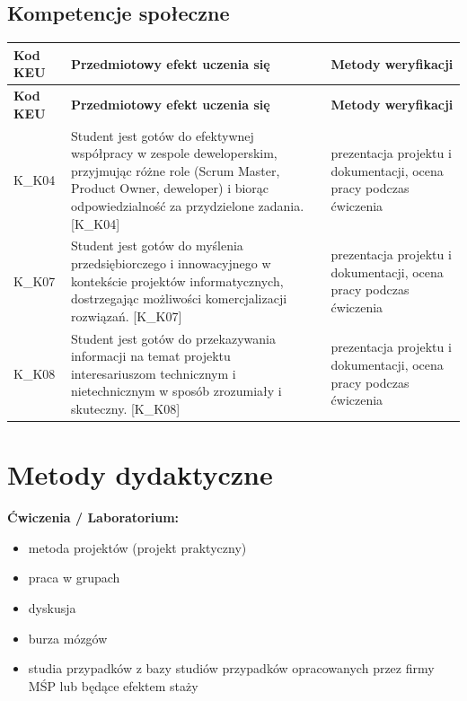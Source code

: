 \documentclass[12pt, a4paper]{article}
\newcommand{\thdrule}{\noalign{\global\setlength{\extrarowheight}{0pt}}}
\newcommand{\thdend}{\noalign{\global\setlength{\extrarowheight}{3pt}}}
\begin{document}
\subsection*{Kompetencje społeczne}
{\scriptsize
\begin{longtable}{m{1.6cm}m{9.0cm}m{4.2cm}}
\thdrule\toprule
\rowcolor{pjatkRed} {\color{white}\footnotesize\textbf{\vphantom{Ag}Kod KEU}} & {\color{white}\footnotesize\textbf{\vphantom{Ag}Przedmiotowy efekt uczenia się}} & {\color{white}\footnotesize\textbf{\vphantom{Ag}Metody weryfikacji}} \\
\midrule\thdend
\endfirsthead
\thdrule\toprule
\rowcolor{pjatkRed} {\color{white}\footnotesize\textbf{\vphantom{Ag}Kod KEU}} & {\color{white}\footnotesize\textbf{\vphantom{Ag}Przedmiotowy efekt uczenia się}} & {\color{white}\footnotesize\textbf{\vphantom{Ag}Metody weryfikacji}} \\
\midrule\thdend
\endhead
  \rowcolor{tableRowLight} K\_K04 & Student jest gotów do efektywnej współpracy w zespole deweloperskim, przyjmując różne role (Scrum Master, Product Owner, deweloper) i biorąc odpowiedzialność za przydzielone zadania. {[}K\_K04{]} & prezentacja projektu i dokumentacji, ocena pracy podczas ćwiczenia \\
  \rowcolor{tableRowAlt} K\_K07 & Student jest gotów do myślenia przedsiębiorczego i innowacyjnego w kontekście projektów informatycznych, dostrzegając możliwości komercjalizacji rozwiązań. {[}K\_K07{]} & prezentacja projektu i dokumentacji, ocena pracy podczas ćwiczenia \\
  \rowcolor{tableRowLight} K\_K08 & Student jest gotów do przekazywania informacji na temat projektu interesariuszom technicznym i nietechnicznym w sposób zrozumiały i skuteczny. {[}K\_K08{]} & prezentacja projektu i dokumentacji, ocena pracy podczas ćwiczenia \\
\bottomrule
\end{longtable}}

\section{Metody dydaktyczne}

\textbf{Ćwiczenia / Laboratorium:}
\begin{itemize}
  \item metoda projektów (projekt praktyczny)
  \item praca w grupach
  \item dyskusja
  \item burza mózgów
  \item studia przypadków z bazy studiów przypadków opracowanych przez firmy MŚP lub będące efektem staży
\end{itemize}
\vspace{4pt}
\end{document}
